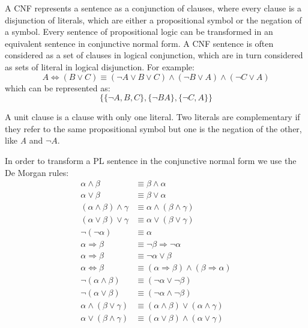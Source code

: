 \documentclass{article}
\begin{document}
A CNF represents a sentence as a conjunction of clauses, where every clause is a disjunction of literals, which are either a propositional symbol or the negation of a symbol. Every sentence of propositional logic can be transformed in an equivalent sentence in conjunctive normal form. A CNF sentence is often considered as a set of clauses in logical conjunction, which are in turn considered as sets of literal in logical disjunction. For example:
    \[A\Leftrightarrow(B\lor C) \equiv (\neg A \lor B \lor C) \land (\neg B \lor A) \land (\neg C \lor A)\]
which can be represented as:
    \[\{\{\neg A, B, C\}, \{\neg B A\}, \{\neg C, A\}\}\]

A unit clause is a clause with only one literal. Two literals are complementary if they refer to the same propositional symbol but one is the negation of the other, like \textit{A} and \(\neg A\).

In order to transform a PL sentence in the conjunctive normal form we use the De Morgan rules:
\begin{align*}
    \alpha \land \beta &\equiv \beta \land \alpha \\
    \alpha \lor \beta &\equiv \beta \lor \alpha \\
    (\alpha \land \beta)\land \gamma &\equiv \alpha \land (\beta \land \gamma) \\
    (\alpha \lor \beta)\lor \gamma &\equiv \alpha \lor (\beta \lor \gamma) \\
    \neg (\neg \alpha) &\equiv \alpha \\
    \alpha \Rightarrow \beta &\equiv \neg \beta \Rightarrow \neg \alpha \\
    \alpha \Rightarrow \beta &\equiv \neg \alpha \lor \beta \\
    \alpha\Leftrightarrow\beta &\equiv (\alpha\Rightarrow\beta) \land (\beta\Rightarrow\alpha) \\
    \neg (\alpha \land \beta) &\equiv (\neg \alpha \lor \neg \beta) \\
    \neg (\alpha \lor \beta) &\equiv (\neg \alpha \land \neg \beta) \\
    \alpha \land (\beta \lor \gamma) &\equiv (\alpha\land\beta)\lor(\alpha\land\gamma) \\
    \alpha \lor (\beta \land \gamma) &\equiv (\alpha \lor \beta)\land(\alpha \lor \gamma)
\end{align*}
\end{document}
